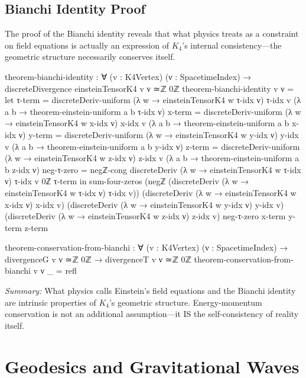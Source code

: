 \documentclass[11pt,a4paper]{book}
\begin{document}
\section{Bianchi Identity Proof}

The proof of the Bianchi identity reveals that what physics treats as a constraint on field equations is actually an expression of $K_4$'s internal consistency—the geometric structure necessarily conserves itself.

\begin{code}
theorem-bianchi-identity : ∀ (v : K4Vertex) (ν : SpacetimeIndex) →
  discreteDivergence einsteinTensorK4 v ν ≃ℤ 0ℤ
theorem-bianchi-identity v ν = 
  let
      τ-term = discreteDeriv-uniform (λ w → einsteinTensorK4 w τ-idx ν) τ-idx v 
                 (λ a b → theorem-einstein-uniform a b τ-idx ν)
      x-term = discreteDeriv-uniform (λ w → einsteinTensorK4 w x-idx ν) x-idx v 
                 (λ a b → theorem-einstein-uniform a b x-idx ν)
      y-term = discreteDeriv-uniform (λ w → einsteinTensorK4 w y-idx ν) y-idx v 
                 (λ a b → theorem-einstein-uniform a b y-idx ν)
      z-term = discreteDeriv-uniform (λ w → einsteinTensorK4 w z-idx ν) z-idx v 
                 (λ a b → theorem-einstein-uniform a b z-idx ν)
      neg-τ-zero = negℤ-cong {discreteDeriv (λ w → einsteinTensorK4 w τ-idx ν) τ-idx v} {0ℤ} τ-term
  in sum-four-zeros (negℤ (discreteDeriv (λ w → einsteinTensorK4 w τ-idx ν) τ-idx v))
                    (discreteDeriv (λ w → einsteinTensorK4 w x-idx ν) x-idx v)
                    (discreteDeriv (λ w → einsteinTensorK4 w y-idx ν) y-idx v)
                    (discreteDeriv (λ w → einsteinTensorK4 w z-idx ν) z-idx v)
                    neg-τ-zero x-term y-term z-term

theorem-conservation-from-bianchi : ∀ (v : K4Vertex) (ν : SpacetimeIndex) →
  divergenceG v ν ≃ℤ 0ℤ → divergenceT v ν ≃ℤ 0ℤ
theorem-conservation-from-bianchi v ν _ = refl
\end{code}

\medskip
\noindent\textit{Summary:} What physics calls Einstein's field equations and the Bianchi identity are intrinsic properties of $K_4$'s geometric structure. Energy-momentum conservation is not an additional assumption—it IS the self-consistency of reality itself.


\chapter{Geodesics and Gravitational Waves}
\label{chap:geodesics-waves}
\end{document}
